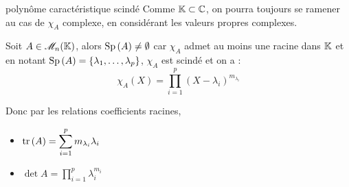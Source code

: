 \begin{proposition}{polynôme caractéristique scindé}{}
    Comme $\mathbb{K} \subset \mathbb{C}$, on pourra toujours se ramener au cas de $\chi_A$ complexe, en 
    considérant les valeurs propres complexes.

    Soit $A \in \mathscr M_n(\mathbb{K})$, alors $\operatorname{Sp} \,(A) \neq \emptyset$ car $\chi_A$ admet au moins une racine dans $\mathbb{K}$
    et en notant $\operatorname{Sp} \,(A) = \{\lambda_1, \ldots, \lambda_p \}$, $\chi_A$ est scindé et on a :
    $$\chi_A(X) = \prod_{i = 1 }^{ p } (X - \lambda_i)^{m_{\lambda_i}}$$

    Donc par les relations coefficients racines, 
    \begin{itemize}
        \item $\displaystyle \operatorname{tr} \,(A) = \sum_{i = 1 }^{ p } m_{\lambda_i} \lambda_i$ 
        \item $\displaystyle \det A = \prod_{i = 1 }^{ p } \lambda_i^{m_{i}}$
    \end{itemize}
\end{proposition}

